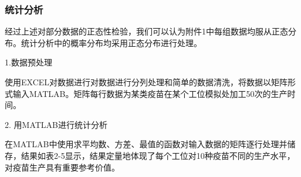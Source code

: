 \documentclass[UTF8]{ctexart}
\begin{document}
	\subsubsection{统计分析}
	经过上述对部分数据的正态性检验，我们可以认为附件1中每组数据均服从正态分布。统计分析中的概率分布均采用正态分布进行处理。
	
	1.数据预处理 
	
	使用EXCEL对数据进行对数据进行分列处理和简单的数据清洗，将数据以矩阵形式输入MATLAB。矩阵每行数据为某类疫苗在某个工位模拟处加工50次的生产时间。
	
	2. 用MATLAB进行统计分析
	
	在MATLAB中使用求平均数、方差、最值的函数对输入数据的矩阵逐行处理并储存，结果如表2-5显示，结果定量地体现了每个工位对10种疫苗不同的生产水平，对疫苗生产具有重要参考价值。
	
\end{document}
